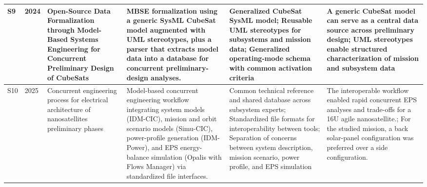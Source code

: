 \documentclass[11pt]{article}
\begin{document}
\begin{longtable}{|p{0.6cm}|p{0.8cm}|p{3.1cm}|p{4.0cm}|p{3.3cm}|p{3.3cm}|}
S9 & 2024 & Open-Source Data Formalization through Model-Based Systems Engineering for Concurrent Preliminary Design of CubeSats & MBSE formalization using a generic SysML CubeSat model augmented with UML stereotypes, plus a parser that extracts model data into a database for concurrent preliminary-design analyses. & Generalized CubeSat SysML model; Reusable UML stereotypes for subsystems and mission data; Generalized operating-mode schema with common activation criteria & A generic CubeSat model can serve as a central data source across preliminary design; UML stereotypes enable structured characterization of mission and subsystem data \\ \hline
S10 & 2025 & Concurrent engineering process for electrical architecture of nanosatellites preliminary phases & Model-based concurrent engineering workflow integrating system models (IDM-CIC), mission and orbit scenario models (Simu-CIC), power-profile generation (IDM-Power), and EPS energy-balance simulation (Opalis with Flows Manager) via standardized file interfaces. & Common technical reference and shared database across subsystem experts; Standardized file formats for interoperability between tools; Separation of concerns between system description, mission scenario, power profile, and EPS simulation & The interoperable workflow enabled rapid concurrent EPS analyses and trade-offs for a 16U agile nanosatellite.; For the studied mission, a back solar-panel configuration was preferred over a side configuration. \\ \hline
\end{longtable}
\end{document}
